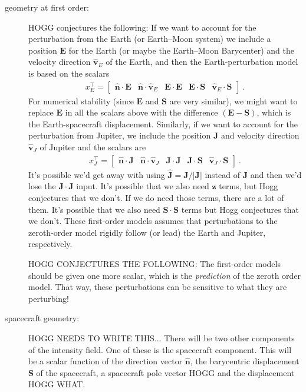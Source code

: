 \documentclass{article}
\renewcommand{\vec}[1]{\mathbf{#1}}
\begin{document}
\begin{description}
    \item[geometry at first order:] HOGG conjectures the following:
    If we want to account for the perturbation from the Earth (or Earth--Moon system) we include a position $\vec{E}$ for the Earth (or maybe the Earth--Moon Barycenter) and the velocity direction $\vec{\hat{v}}_E$ of the Earth, and then the Earth-perturbation model is based on the scalars
    \begin{align}
        x_E^\top = \begin{bmatrix}
        \vec{\hat{n}} \cdot \vec{E} &
        \vec{\hat{n}} \cdot \vec{\hat{v}}_E &
        \vec{E} \cdot \vec{E} &
        \vec{E} \cdot \vec{S} &
        \vec{\hat{v}}_E \cdot \vec{S}
        \end{bmatrix} ~.
    \end{align}
    For numerical stability (since $\vec{E}$ and $\vec{S}$ are very similar), we might want to replace $\vec{E}$ in all the scalars above with the difference $(\vec{E}-\vec{S})$, which is the Earth-spacecraft displacement.
    Similarly, if we want to account for the perturbation from Jupiter, we include the position $\vec{J}$ and velocity direction $\vec{\hat{v}}_J$ of Jupiter and the scalars are
    \begin{align}
        x_J^\top = \begin{bmatrix}
        \vec{\hat{n}} \cdot \vec{J} &
        \vec{\hat{n}} \cdot \vec{\hat{v}}_J &
        \vec{J} \cdot \vec{J} &
        \vec{J} \cdot \vec{S} &
        \vec{\hat{v}}_J \cdot \vec{S}
        \end{bmatrix} ~.
    \end{align}
    It's possible we'd get away with using $\vec{\hat{J}}=\vec{J}/|\vec{J}|$ instead of $\vec{J}$ and then we'd lose the $\vec{J}\cdot\vec{J}$ input.
    It's possible that we also need $\vec{\hat{z}}$ terms, but Hogg conjectures that we don't. If we do need those terms, there are a lot of them. It's possible that we also need $\vec{S}\cdot\vec{S}$ terms but Hogg conjectures that we don't.
    These first-order models assumes that perturbations to the zeroth-order model rigidly follow (or lead) the Earth and Jupiter, respectively.

    HOGG CONJECTURES THE FOLLOWING: The first-order models should be given one more scalar, which is the \emph{prediction} of the zeroth order model. That way, these perturbations can be sensitive to what they are perturbing!

    \item[spacecraft geometry:] HOGG NEEDS TO WRITE THIS...
    There will be two other components of the intensity field.
    One of these is the spacecraft component.
    This will be a scalar function of the direction vector $\vec{\hat{n}}$, the barycentric displacement $\vec{S}$ of the spacecraft, a spacecraft pole vector HOGG and the displacement HOGG WHAT.


\end{description}
\end{document}
